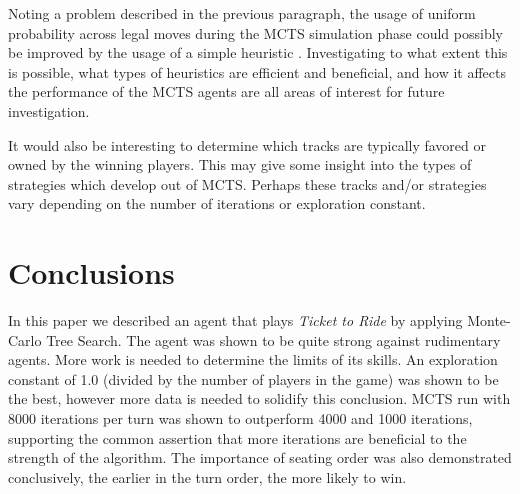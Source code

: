 \documentclass[11pt, letterpaper, twoside]{article}
\begin{document}
Noting a problem described in the previous paragraph, the usage of uniform probability across legal moves during the MCTS simulation phase could possibly be improved by the usage of a simple heuristic \cite{rave}. Investigating to what extent this is possible, what types of heuristics are efficient and beneficial, and how it affects the performance of the MCTS agents are all areas of interest for future investigation. 

It would also be interesting to determine which tracks are typically favored or owned by the winning players. This may give some insight into the types of strategies which develop out of MCTS. Perhaps these tracks and/or strategies vary depending on the number of iterations or exploration constant. 

\section{Conclusions}

In this paper we described an agent that plays \textit{Ticket to Ride} by applying Monte-Carlo Tree Search. The agent was shown to be quite strong against rudimentary agents. More work is needed to determine the limits of its skills. An exploration constant of 1.0 (divided by the number of players in the game) was shown to be the best, however more data is needed to solidify this conclusion. MCTS run with 8000 iterations per turn was shown to outperform 4000 and 1000 iterations, supporting the common assertion that more iterations are beneficial to the strength of the algorithm. The importance of seating order was also demonstrated conclusively, the earlier in the turn order, the more likely to win.



\end{document}
